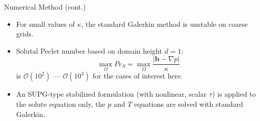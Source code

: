\documentclass[compress,12pt]{beamer}
\newcommand{\bv}[1]{{\boldsymbol{#1}}}
\begin{document}
\begin{frame}{Numerical Method (cont.)}
  \begin{itemize}
  \item For small values of $\kappa$, the standard Galerkin method is unstable
    on coarse grids.
  \item Solutal Peclet number based on domain height $d=1$:
    \begin{equation}
      \nonumber
      \max_{\Omega} Pe_S = \max_{\Omega} \frac{|\bv{b}-\nabla p|}{\kappa}
    \end{equation}
    is $\mathcal{O}\left(10^2\right)$ --- $\mathcal{O}\left(10^3\right)$
    for the cases of interest here.

  \item An SUPG-type stabilized formulation (with nonlinear, scalar $\tau$)
    is applied to the solute equation only, the $p$ and $T$ equations are
    solved with standard Galerkin.
    
    
    
      
  \end{itemize}

\end{frame}
\end{document}
